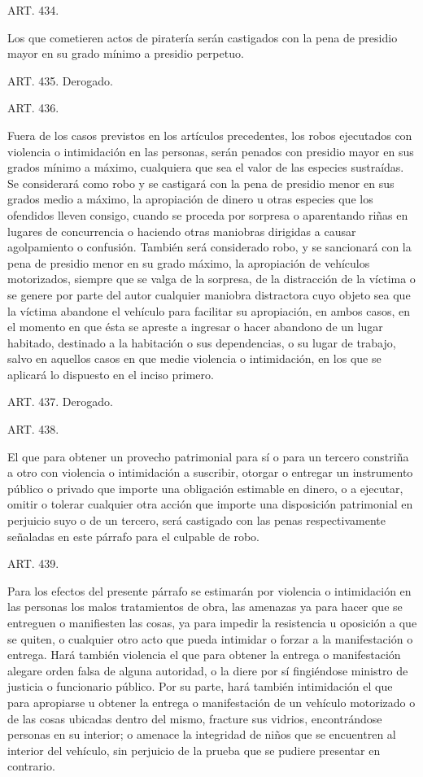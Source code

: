     ART. 434.

    Los que cometieren actos de piratería serán castigados con la pena de presidio mayor en su grado mínimo a presidio perpetuo.





    ART. 435.    Derogado.

    ART. 436.

    Fuera de los casos previstos en los artículos precedentes, los robos ejecutados con violencia o intimidación en las personas, serán penados con presidio mayor en sus grados mínimo a máximo, cualquiera que sea el valor de las especies sustraídas.
    Se considerará como robo y se castigará con la pena de presidio menor en sus grados medio a máximo, la apropiación de dinero u otras especies que los ofendidos lleven consigo, cuando se proceda por sorpresa o aparentando riñas en lugares de concurrencia o haciendo otras maniobras dirigidas a causar agolpamiento o confusión.
    También será considerado robo, y se sancionará con la pena de presidio menor en su grado máximo, la apropiación de vehículos motorizados, siempre que se valga de la sorpresa, de la distracción de la víctima o se genere por parte del autor cualquier maniobra distractora cuyo objeto sea que la víctima abandone el vehículo para facilitar su apropiación, en ambos casos, en el momento en que ésta se apreste a ingresar o hacer abandono de un lugar habitado, destinado a la habitación o sus dependencias, o su lugar de trabajo, salvo en aquellos casos en que medie violencia o intimidación, en los que se aplicará lo dispuesto en el inciso primero.


    ART. 437.    Derogado.


    ART. 438.

    El que para obtener un provecho patrimonial para sí o para un tercero constriña a otro con violencia o intimidación a suscribir, otorgar o entregar un instrumento público o privado que importe una obligación estimable en dinero, o a ejecutar, omitir o tolerar cualquier otra acción que importe una disposición patrimonial en perjuicio suyo o de un tercero, será castigado con las penas respectivamente señaladas en este párrafo para el culpable de robo.

    ART. 439.

    Para los efectos del presente párrafo se estimarán por violencia o intimidación en las personas los malos tratamientos de obra, las amenazas ya para hacer que se entreguen o manifiesten las cosas, ya para impedir la resistencia u oposición a que se quiten, o cualquier otro acto que pueda intimidar o forzar a la manifestación o entrega. Hará también violencia el que para obtener la entrega o manifestación alegare orden falsa de alguna autoridad, o la diere por sí fingiéndose ministro de justicia o funcionario público. Por su parte, hará también intimidación el que para apropiarse u obtener la entrega o manifestación de un vehículo motorizado o de las cosas ubicadas dentro del mismo, fracture sus vidrios, encontrándose personas en su interior; o amenace la integridad de niños que se encuentren al interior del vehículo, sin perjuicio de la prueba que se pudiere presentar en contrario.



